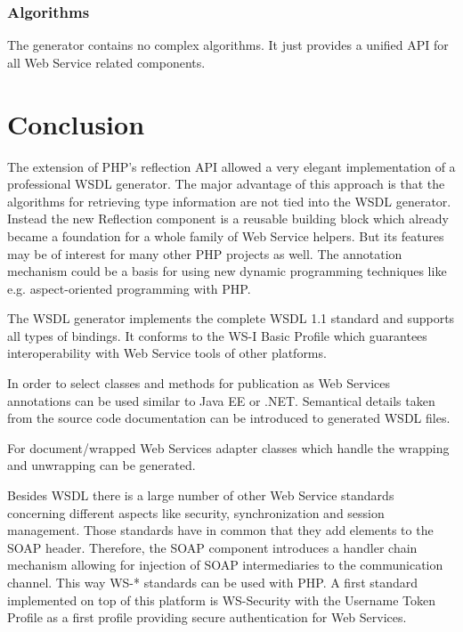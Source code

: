 \documentclass[10pt,final,a4paper,oneside]{article}
\begin{document}

\subsubsection{Algorithms}
The generator contains no complex algorithms.
It just provides a unified API
for all Web Service related components.





\section{Conclusion}
The extension of PHP's reflection API allowed a very elegant 
implementation of a professional WSDL generator. The major advantage of 
this approach is that the algorithms for retrieving type information are 
not tied into the WSDL generator. Instead the new Reflection component is a 
reusable building block which already became a foundation for a whole 
family of Web Service helpers. But its features may be of interest for many
other PHP projects as well. The annotation mechanism could be a basis 
for using new dynamic programming techniques like e.g. aspect-oriented 
programming with PHP. 

The WSDL generator implements the complete WSDL 1.1 standard and 
supports all types of bindings. It conforms to the WS-I Basic Profile 
which guarantees interoperability with Web Service tools of other 
platforms. 

In order to select classes and methods for publication as Web Services 
annotations can be used similar to Java EE or .NET. Semantical details 
taken from the source code documentation can be introduced to generated
WSDL files.

For document/wrapped Web Services adapter classes which handle the 
wrapping and unwrapping can be generated. 

Besides WSDL there is a large number of other Web Service standards concerning 
different aspects like security, synchronization and session management. 
Those standards have in common that they add elements to the SOAP 
header. Therefore, the SOAP component introduces a handler chain 
mechanism allowing for injection of SOAP intermediaries to the 
communication channel. This way WS-* standards can be used with PHP. A 
first standard implemented on top of this platform is WS-Security with 
the Username Token Profile as a first profile providing secure 
authentication for Web Services. 
\end{document}
